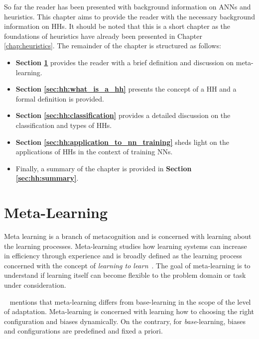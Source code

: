 So far the reader has been presented with background information on \acp{ANN} and heuristics. This chapter aims to provide the reader with the necessary background information on \acp{HH}. It should be noted that this is a short chapter as the foundations of heuristics have already been presented in Chapter \ref{chap:heuristics}. The remainder of the chapter is structured as follows:

\begin{itemize}
      \item \textbf{Section \ref{sec:hh:meta_learning}} provides the reader with a brief definition and discussion on meta-learning.

      \item \textbf{Section \ref{sec:hh:what_is_a_hh}} presents the concept of a \ac{HH} and a formal definition is provided.

      \item \textbf{Section \ref{sec:hh:classification}} provides a detailed discussion on the classification and types of \acp{HH}.

      \item \textbf{Section \ref{sec:hh:application_to_nn_training}} sheds light on the applications of \acp{HH} in the context of training \acp{NN}.

      \item Finally, a summary of the chapter is provided in \textbf{Section \ref{sec:hh:summary}}.
\end{itemize}



\section{Meta-Learning}
\label{sec:hh:meta_learning}

Meta learning is a branch of metacognition and is concerned with learning about the learning processes. Meta-learning studies how learning systems can increase in efficiency through experience and is broadly defined as the learning process concerned with the concept of \textit{learning to learn}~\cite{ref:vilalta:2002}. The goal of meta-learning is to understand if learning itself can become flexible to the problem domain or task under consideration.

\citeauthor{ref:vilalta:2002}~\cite{ref:vilalta:2002} mentions that meta-learning differs from base-learning in the scope of the level of adaptation. Meta-learning is concerned with learning how to choosing the right configuration and biases dynamically. On the contrary, for \textit{base}-learning, biases and configurations are predefined and fixed a priori.


